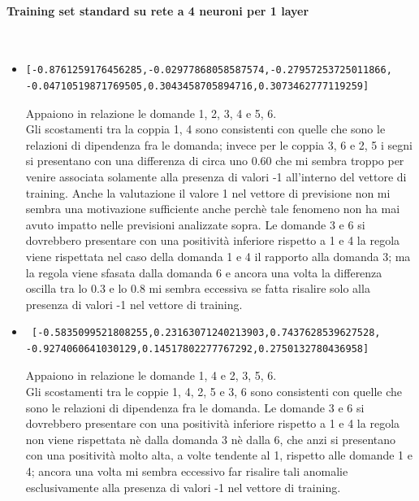 \paragraph{Training set standard su rete a 4 neuroni per 1 layer}\mbox{}
\label{Training set standard su rete a 4 neuroni per 1 layer}
\\
\noindent
\begin{itemize}
\item \begin{verbatim}[-0.8761259176456285,-0.02977868058587574,-0.27957253725011866,
-0.04710519871769505,0.3043458705894716,0.3073462777119259]
\end{verbatim}
Appaiono in relazione le domande 1, 2, 3, 4  e 5, 6.\\
Gli scostamenti tra la coppia 1, 4 sono consistenti con quelle che sono le relazioni di dipendenza fra le domanda; invece per le coppia 3, 6 e 2, 5 i segni si presentano con una differenza di circa uno 0.60 che mi sembra troppo per venire associata solamente alla presenza di valori -1 all'interno del vettore di training. Anche la valutazione il valore 1 nel vettore di previsione non mi sembra una motivazione sufficiente anche perch\`e tale fenomeno non ha mai avuto impatto nelle previsioni analizzate sopra.
Le domande 3 e 6 si dovrebbero presentare con una positivit\`a inferiore rispetto a 1 e 4 la regola viene rispettata nel caso della domanda 1 e 4 il rapporto alla domanda 3; ma la regola viene sfasata dalla domanda 6 e ancora una volta la differenza oscilla tra lo 0.3 e lo 0.8 mi sembra eccessiva se fatta risalire solo alla presenza di valori -1 nel vettore di training.

\item \begin{verbatim} [-0.5835099521808255,0.23163071240213903,0.7437628539627528,
-0.9274060641030129,0.14517802277767292,0.2750132780436958]
\end{verbatim}
Appaiono in relazione le domande 1, 4 e 2, 3, 5, 6.\\
Gli scostamenti tra le coppie 1, 4, 2, 5 e 3, 6  sono consistenti con quelle che sono le relazioni di dipendenza fra le domanda.
Le domande 3 e 6 si dovrebbero presentare con una positivit\`a inferiore rispetto a 1 e 4 la regola non viene rispettata n\`e dalla domanda 3 n\`e dalla 6, che anzi si presentano con una positivit\`a molto alta, a volte tendente al 1, rispetto alle domande 1 e 4; ancora una volta mi sembra eccessivo far risalire tali anomalie esclusivamente alla presenza di valori -1 nel vettore di training.


\end{itemize}
